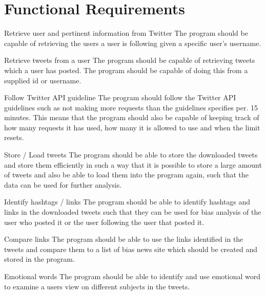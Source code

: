 \section{Functional Requirements}

\begin{requirement}{Retrieve user and pertinent information from Twitter}
The program should be capable of retrieving the users a user is
following given a specific user's username.
\end{requirement}

\begin{requirement}{Retrieve tweets from a user}
The program should be capable of retrieving tweets which a user has posted. The
program should be capable of doing this from a supplied id or username.
\end{requirement}

\begin{requirement}{Follow Twitter \ac{API} guideline}
The program should follow the Twitter \ac{API} guidelines such as not making
more requests than the guidelines specifies per. 15 minutes. This means that the
program should also be capable of keeping track of how many requests it has
used, how many it is allowed to use and when the limit resets.
\end{requirement}

\begin{requirement}{Store / Load tweets}
The program should be able to store the downloaded tweets and store them
efficiently in such a way that it is possible to store a large amount of tweets
and also be able to load them into the program again, such that the data can be
used for further analysis.
\end{requirement}

\begin{requirement}{Identify hashtags / links}
The program should be able to identify hashtags and links in the downloaded
tweets such that they can be used for bias analysis of the user who posted it or
the user following the user that posted it.
\end{requirement}

\begin{requirement}{Compare links}
The program should be able to use the links identified in the tweets and compare
them to a list of bias news site which should be created and stored in the
program. 
\end{requirement}

\begin{requirement}{Emotional  words}
The program should be able to identify and use emotional word to examine a users
view on different subjects in the tweets. 
\end{requirement}

